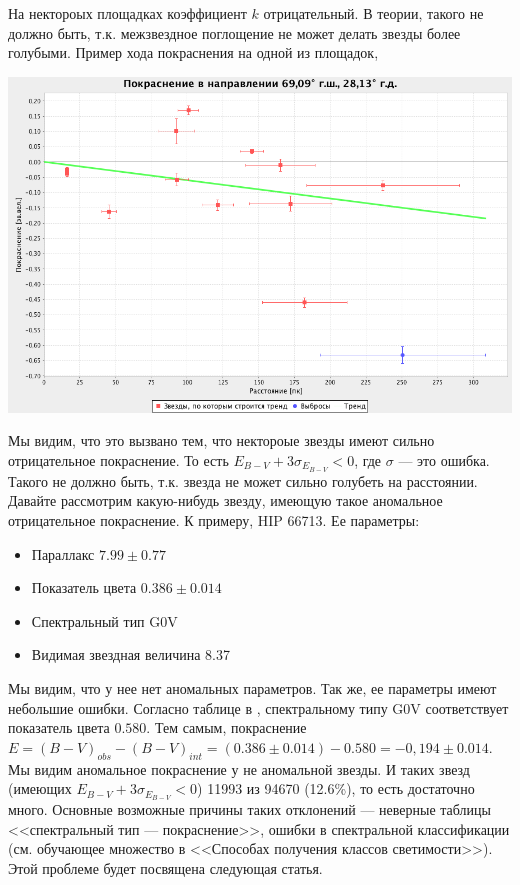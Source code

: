 \documentclass[14pt]{article}
\begin{document}
        На нектороых площадках коэффициент $k$ отрицательный. В теории, такого не должно быть, т.к. межзвездное поглощение не может делать звезды более голубыми. Пример хода покраснения на одной из площадок,
        \begin{center}
            \includegraphics[scale=0.3]{../../presentation/real-4-k.png}
        \end{center}	
        Мы видим, что это вызвано тем, что нектороые звезды имеют сильно отрицательное покраснение. То есть $E_{B - V} + 3 \sigma_{E_{B - V}} < 0$, где $\sigma$ --- это ошибка. Такого не должно быть, т.к. звезда не может сильно голубеть на расстоянии. 
        Давайте рассмотрим какую-нибудь звезду, имеющую такое аномальное отрицательное покраснение. К примеру, HIP 66713. Ее параметры:
        \begin{itemize}
            \item Параллакс $7.99 \pm 0.77$
            \item Показатель цвета $0.386 \pm 0.014$
            \item Спектральный тип G0V
            \item Видимая звездная величина 8.37
        \end{itemize}                
        Мы видим, что у нее нет аномальных параметров. Так же, ее параметры имеют небольшие ошибки. Согласно таблице в \cite{tsvetkov}, спектральному типу G0V соответствует показатель цвета $0.580$. Тем самым, покраснение $E = (B - V)_{obs} - (B - V)_{int} = (0.386 \pm 0.014) - 0.580 = -0,194 \pm 0.014$. Мы видим аномальное покраснение у не аномальной звезды. 
        И таких звезд (имеющих $E_{B - V} + 3 \sigma_{E_{B - V}} < 0$) 11993 из 94670 (12.6\%), то есть достаточно много. Основные возможные причины таких отклонений --- неверные таблицы <<спектральный тип --- покраснение>>, ошибки в спектральной классификации (см. обучающее множество в <<Способах получения классов светимости>>). Этой проблеме будет посвящена следующая статья.  
    
\end{document}
